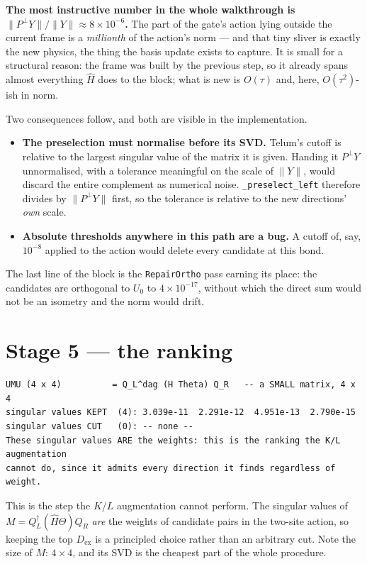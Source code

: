 \documentclass[11pt,a4paper]{article}
\newcommand{\Hb}{\hat{H}}
\newcommand{\Theb}{\Theta}
\newcommand{\Pperp}{P^{\perp}}
\newcommand{\Dex}{D_{\mathrm{ex}}}
\newcommand{\code}[1]{\texttt{\small #1}}
\begin{document}
\noindent
\textbf{The most instructive number in the whole walkthrough is
$\|\Pperp Y\|/\|Y\| \approx 8\times10^{-6}$.} The part of the gate's action lying outside the
current frame is a \emph{millionth} of the action's norm --- and that tiny sliver is exactly the
new physics, the thing the basis update exists to capture. It is small for a structural reason:
the frame was built by the previous step, so it already spans almost everything $\Hb$ does to
the block; what is new is $O(\tau)$ and, here, $O(\tau^2)$-ish in norm.

Two consequences follow, and both are visible in the implementation.

\begin{itemize}[leftmargin=1.2em]
\item \textbf{The preselection must normalise before its SVD.} Telum's cutoff is relative to the
largest singular value of the matrix it is given. Handing it $\Pperp Y$ unnormalised, with a
tolerance meaningful on the scale of $\|Y\|$, would discard the entire complement as numerical
noise. \code{\_preselect\_left} therefore divides by $\|\Pperp Y\|$ first, so the tolerance is
relative to the new directions' \emph{own} scale.
\item \textbf{Absolute thresholds anywhere in this path are a bug.} A cutoff of, say, $10^{-8}$
applied to the action would delete every candidate at this bond.
\end{itemize}

\noindent
The last line of the block is the \code{RepairOrtho} pass earning its place: the candidates are
orthogonal to $U_0$ to $4\times10^{-17}$, without which the direct sum would not be an isometry
and the norm would drift.

\section{Stage 5 --- the ranking}

\begin{lstlisting}
UMU (4 x 4)          = Q_L^dag (H Theta) Q_R   -- a SMALL matrix, 4 x 4
singular values KEPT  (4): 3.039e-11  2.291e-12  4.951e-13  2.790e-15
singular values CUT   (0): -- none --
These singular values ARE the weights: this is the ranking the K/L augmentation
cannot do, since it admits every direction it finds regardless of weight.
\end{lstlisting}

\noindent
This is the step the $K$/$L$ augmentation cannot perform. The singular values of
$M = Q_L^\dagger (\Hb\Theb) Q_R$ \emph{are} the weights of candidate pairs in the two-site
action, so keeping the top $\Dex$ is a principled choice rather than an arbitrary cut. Note the
size of $M$: $4\times4$, and its SVD is the cheapest part of the whole procedure.
\end{document}
